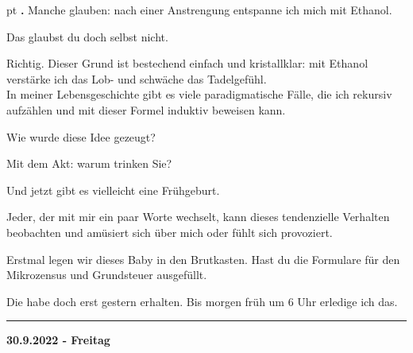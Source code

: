 \documentclass[10pt,a4paper]{article}
\newcounter{notec}
\newcommand\notep[1]{%
  \stepcounter{notec}
  \vskip #1pt
  {\bf\arabic{notec}.}
}
\newcommand\rele[1] {{\color {english} \bf {#1}}}         %
\newcommand\ddivide {\vskip -9pt \hrule \vskip 6pt}
\begin{document}
\begin{mdframed}[style=daystyle]
  \notep 4 Manche glauben: nach einer Anstrengung entspanne ich mich mit
  Ethanol.

  \vskip 2pt
  Das glaubst du doch selbst nicht.

  \vskip 2pt
  Richtig. Dieser Grund ist bestechend einfach und kristallklar: mit Ethanol
  verstärke ich das Lob- und schwäche das Tadelgefühl. \\
  In meiner Lebensgeschichte gibt es viele paradigmatische Fälle, die ich
  rekursiv aufzählen und mit dieser Formel induktiv beweisen kann.

  \vskip 2pt
  Wie wurde diese Idee gezeugt?

  \vskip 2pt
  Mit dem Akt: warum trinken Sie?

  \vskip 2pt
  Und jetzt gibt es vielleicht eine Frühgeburt.

  \vskip 2pt
  Jeder, der mit mir ein paar Worte wechselt, kann dieses tendenzielle Verhalten
  beobachten und amüsiert sich über mich oder fühlt sich provoziert.

  \vskip 2pt
  Erstmal legen wir dieses Baby in den Brutkasten. Hast du die Formulare für den
  Mikrozensus und Grundsteuer ausgefüllt.

  \vskip 2pt
  Die habe doch erst gestern erhalten. Bis morgen früh um 6 Uhr erledige ich das.

\end{mdframed}


\ddivide
{\rele {30.9.2022 - Freitag}}
       
\end{document}
